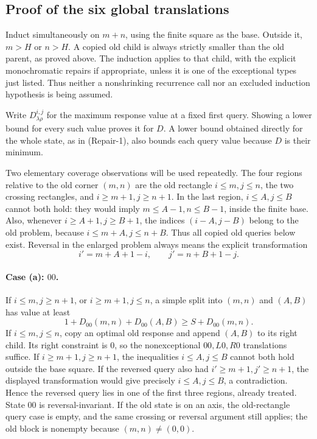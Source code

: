 \documentclass[11pt]{article}
\theoremstyle{definition}
\theoremstyle{remark}
\begin{document}
\subsection{Proof of the six global translations}
Induct simultaneously on $m+n$, using the finite square as the base.
Outside it, $m>H$ or $n>H$. A copied old child is always strictly smaller
than the old parent, as proved above. The induction applies to that child,
with the explicit monochromatic repairs if appropriate, unless it is one
of the exceptional types just listed. Thus neither a nonshrinking recurrence
call nor an excluded induction hypothesis is being assumed.

Write $D^{i,j}_{\lambda\rho}$ for the maximum response value at a fixed
first query. Showing a lower bound for every such value proves it for $D$.
A lower bound obtained directly for the whole state, as in (Repair-1), also
bounds each query value because $D$ is their minimum.

Two elementary coverage observations will be used repeatedly. The four
regions relative to the old corner $(m,n)$ are the old rectangle
$i\le m,j\le n$, the two crossing rectangles, and
$i\ge m+1,j\ge n+1$. In the last region, $i\le A,j\le B$ cannot both hold:
they would imply $m\le A-1,n\le B-1$, inside the finite base. Also, whenever
$i\ge A+1,j\ge B+1$, the indices $(i-A,j-B)$ belong to the old problem,
because $i\le m+A,j\le n+B$. Thus all copied old queries below exist.
Reversal in the enlarged problem always means the explicit transformation
\[
 i'=m+A+1-i,\qquad j'=n+B+1-j.
\]

\paragraph{Case (a): $00$.}
If $i\le m,j\ge n+1$, or $i\ge m+1,j\le n$, a simple split into $(m,n)$ and
$(A,B)$ has value at least
\[
 1+D_{00}(m,n)+D_{00}(A,B)\ge S+D_{00}(m,n).
\]
If $i\le m,j\le n$, copy an optimal old response and append $(A,B)$ to its
right child. Its right constraint is $0$, so the nonexceptional $00,L0,R0$
translations suffice. If $i\ge m+1,j\ge n+1$, the inequalities
$i\le A,j\le B$ cannot both hold outside the base square. If the reversed
query also had $i'\ge m+1,j'\ge n+1$, the displayed transformation would
give precisely $i\le A,j\le B$, a contradiction. Hence the reversed query
lies in one of the first three regions, already treated. State $00$ is
reversal-invariant. If the old state is on an axis, the old-rectangle query
case is empty, and the same crossing or reversal argument still applies;
the old block is nonempty because $(m,n)\ne(0,0)$.
\end{document}
